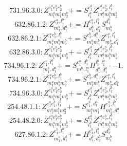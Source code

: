 \documentclass[letterpaper,10pt,fleqn,leqno,onecolumn]{article}
\begin{document}
\begin{equation} \;\;\;\;\;\;  731.96.3.0: Z^{e_{1}^{a}e_{1}^{b}e_{2}^{b}}_{m_{1}^{a}m_{1}^{b}m_{2}^{b}}+=S^{e_{1}^{b}}_{l_{1}^{b}}Z^{e_{1}^{a}e_{2}^{b},l_{1}^{b}}_{m_{1}^{a}m_{1}^{b}m_{2}^{b}} \end{equation}
\begin{equation} \;\;\;\;\;\;  632.86.1.2: Z^{e_{1}^{a},l_{1}^{b}}_{m_{1}^{b},d_{1}^{a}}+=H^{e_{1}^{a},l_{1}^{b}}_{d_{1}^{b},d_{1}^{a}}S^{d_{1}^{b}}_{m_{1}^{b}} \end{equation}
\begin{equation} \;\;\;\;\;\;  632.86.2.1: Z^{e_{1}^{a}e_{1}^{b},l_{1}^{b}}_{m_{1}^{a}m_{1}^{b}m_{2}^{b}}+=S^{e_{1}^{b},d_{1}^{a}}_{m_{1}^{a}m_{1}^{b}}Z^{e_{1}^{a},l_{1}^{b}}_{m_{2}^{b},d_{1}^{a}} \end{equation}
\begin{equation} \;\;\;\;\;\;  632.86.3.0: Z^{e_{1}^{a}e_{1}^{b}e_{2}^{b}}_{m_{1}^{a}m_{1}^{b}m_{2}^{b}}+=S^{e_{1}^{b}}_{l_{1}^{b}}Z^{e_{1}^{a}e_{2}^{b},l_{1}^{b}}_{m_{1}^{a}m_{1}^{b}m_{2}^{b}} \end{equation}
\begin{equation} \;\;\;\;\;\;  734.96.1.2: Z^{e_{1}^{a},l_{1}^{b}}_{m_{1}^{b},d_{1}^{a}}+=S^{e_{1}^{a},d_{1}^{b}}_{m_{1}^{b},l_{1}^{a}}H^{l_{1}^{b},l_{1}^{a}}_{d_{1}^{b},d_{1}^{a}}\cdot -1. \end{equation}
\begin{equation} \;\;\;\;\;\;  734.96.2.1: Z^{e_{1}^{a}e_{1}^{b},l_{1}^{b}}_{m_{1}^{a}m_{1}^{b}m_{2}^{b}}+=S^{e_{1}^{b},d_{1}^{a}}_{m_{1}^{a}m_{1}^{b}}Z^{e_{1}^{a},l_{1}^{b}}_{m_{2}^{b},d_{1}^{a}} \end{equation}
\begin{equation} \;\;\;\;\;\;  734.96.3.0: Z^{e_{1}^{a}e_{1}^{b}e_{2}^{b}}_{m_{1}^{a}m_{1}^{b}m_{2}^{b}}+=S^{e_{1}^{b}}_{l_{1}^{b}}Z^{e_{1}^{a}e_{2}^{b},l_{1}^{b}}_{m_{1}^{a}m_{1}^{b}m_{2}^{b}} \end{equation}
\begin{equation} \;\;\;\;\;\;  254.48.1.1: Z^{e_{1}^{a}e_{1}^{b},l_{1}^{b}}_{m_{1}^{a}m_{1}^{b}m_{2}^{b}}+=S^{e_{1}^{b},d_{1}^{a}}_{m_{1}^{a}m_{1}^{b}}H^{e_{1}^{a},l_{1}^{b}}_{m_{2}^{b},d_{1}^{a}} \end{equation}
\begin{equation} \;\;\;\;\;\;  254.48.2.0: Z^{e_{1}^{a}e_{1}^{b}e_{2}^{b}}_{m_{1}^{a}m_{1}^{b}m_{2}^{b}}+=S^{e_{1}^{b}}_{l_{1}^{b}}Z^{e_{1}^{a}e_{2}^{b},l_{1}^{b}}_{m_{1}^{a}m_{1}^{b}m_{2}^{b}} \end{equation}
\begin{equation} \;\;\;\;\;\;  627.86.1.2: Z^{e_{1}^{b},l_{1}^{b}}_{m_{1}^{b},d_{1}^{b}}+=H^{e_{1}^{b},l_{1}^{b}}_{d_{1}^{b},d_{2}^{b}}S^{d_{2}^{b}}_{m_{1}^{b}} \end{equation}
\end{document}
